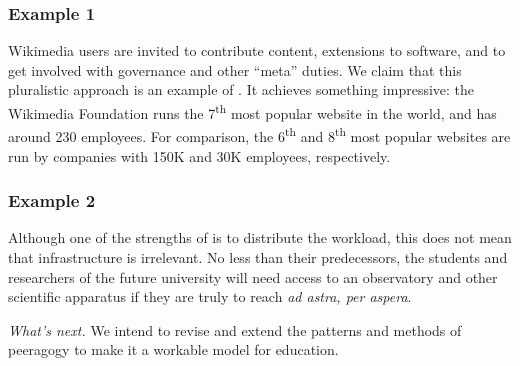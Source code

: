 \subsubsection*{Example 1} Wikimedia users are invited to contribute content, extensions to
software, and to get involved with governance and other ``meta''
duties.  We claim that this pluralistic approach is an example of
.  It achieves something impressive: the
Wikimedia Foundation runs the 7\textsuperscript{th} most popular
website in the world, and has around 230 employees.  For comparison,
the 6\textsuperscript{th} and 8\textsuperscript{th} most popular
websites are run by companies with 150K and 30K employees,
respectively.

\subsubsection*{Example 2} Although one of the strengths of  is to
distribute the workload, this does not mean that infrastructure is
irrelevant.  No less than their predecessors, the students and
researchers of the future university will need access to an
observatory and other scientific apparatus if they are truly to reach \emph{ad astra, per aspera}.

\begin{framed}
\noindent 
\emph{What's next.} We intend to revise and extend the patterns and methods of peeragogy to make it a workable model for education.
\end{framed}



  

  
  
  